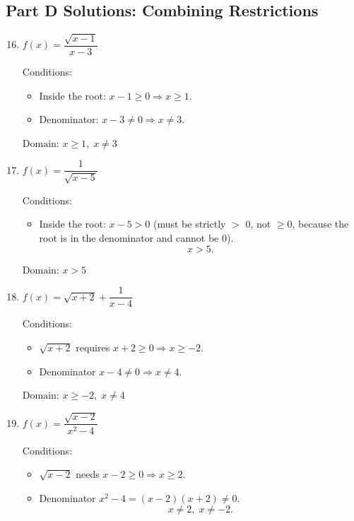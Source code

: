 \documentclass[14pt]{extarticle}
\begin{document}
\subsection*{Part D Solutions: Combining Restrictions}
\begin{enumerate}
  \setcounter{enumi}{15}
  \item \(f(x) = \dfrac{\sqrt{x - 1}}{x - 3}\)

  Conditions:
  \begin{itemize}
    \item Inside the root: \(x - 1 \ge 0 \Rightarrow x \ge 1.\)
    \item Denominator: \(x - 3 \ne 0 \Rightarrow x \ne 3.\)
  \end{itemize}

  \(\boxed{\text{Domain: } x \ge 1,\; x \ne 3}\)

  \item \(f(x) = \dfrac{1}{\sqrt{x - 5}}\)

  Conditions:
  \begin{itemize}
    \item Inside the root: \(x - 5 > 0\) (must be strictly \(>\) 0, not \(\ge 0\), because the root is in the denominator and cannot be 0).
    \[
    x > 5.
    \]
  \end{itemize}

  \(\boxed{\text{Domain: } x > 5}\)

  \item \(f(x) = \sqrt{x + 2} + \dfrac{1}{x - 4}\)

  Conditions:
  \begin{itemize}
    \item \(\sqrt{x + 2}\) requires \(x + 2 \ge 0 \Rightarrow x \ge -2.\)
    \item Denominator \(x - 4 \ne 0 \Rightarrow x \ne 4.\)
  \end{itemize}

  \(\boxed{\text{Domain: } x \ge -2,\; x \ne 4}\)

  \item \(f(x) = \dfrac{\sqrt{x - 2}}{x^2 - 4}\)

  Conditions:
  \begin{itemize}
    \item \(\sqrt{x - 2}\) needs \(x - 2 \ge 0 \Rightarrow x \ge 2.\)
    \item Denominator \(x^2 - 4 = (x - 2)(x + 2) \ne 0.\)
    \[
    x \ne 2,\; x \ne -2.
    \]
  \end{itemize}


\end{enumerate}
\end{document}

